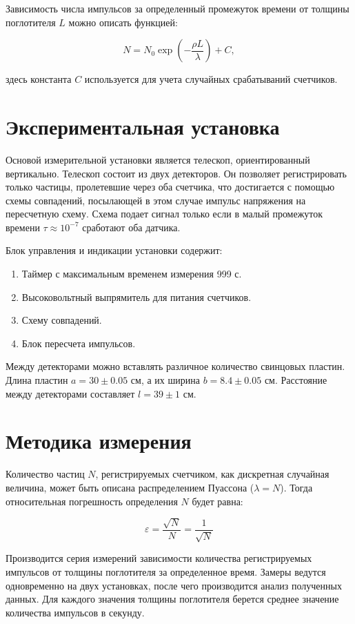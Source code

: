 \documentclass[reprint, nofootinbib, nobalancelastpage, 10pt]{revtex4-2}
\begin{document}
Зависимость числа импульсов за определенный промежуток времени от толщины поглотителя $L$
можно описать функцией:

\begin{equation}
	\label{eq:expon}
	N = N_0 \exp \left(-\dfrac{\rho L}{\lambda} \right) + C,
\end{equation}

здесь константа $C$ используется для учета случайных срабатываний счетчиков.

\section*{Экспериментальная установка}

Основой измерительной установки является телескоп, ориентированный вертикально. Телескоп
состоит из двух детекторов. Он позволяет регистрировать только частицы, пролетевшие через
оба счетчика, что достигается с помощью схемы совпадений, посылающей в этом случае импульс
напряжения на пересчетную схему. Схема подает сигнал только если в малый промежуток
времени $\tau \approx 10^{-7}$ сработают оба датчика.

Блок управления и индикации установки содержит:

\begin{enumerate}
	\item Таймер с максимальным временем измерения 999 с.
	\item Высоковольтный выпрямитель для питания счетчиков.
	\item Схему совпадений.
	\item Блок пересчета импульсов.
\end{enumerate}

Между детекторами можно вставлять различное количество свинцовых пластин. Длина пластин
$a = 30 \pm 0.05$ см, а их ширина $b = 8.4 \pm 0.05$ см. Расстояние между детекторами
составляет $l = 39 \pm 1$ см.

\section*{Методика измерения}

Количество частиц $N$, регистрируемых счетчиком, как дискретная случайная величина, может
быть описана распределением Пуассона ($\lambda = N$). Тогда относительная погрешность
определения $N$ будет равна:

\[ \varepsilon = \dfrac{\sqrt{N}}{N} = \dfrac{1}{\sqrt{N}} \]

Производится серия измерений зависимости количества регистрируемых импульсов от толщины
поглотителя за определенное время. Замеры ведутся одновременно на двух установках, после
чего производится анализ полученных данных. Для каждого значения толщины поглотителя
берется среднее значение количества импульсов в секунду.
\end{document}
